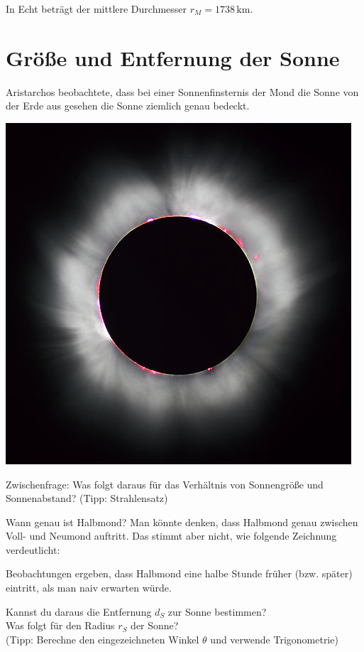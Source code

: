 \documentclass{scrartcl}
\newcommand{\RM}{r_M} %
\newcommand{\RS}{r_S} %
\newcommand{\DS}{d_S} %
\newcommand{\km}{\,\mathrm{km}} %
\begin{document}
  In Echt beträgt der mittlere Durchmesser $\RM = 1738 \km$.

  \newpage
  \section{Größe und Entfernung der Sonne}

  Aristarchos beobachtete, dass bei einer Sonnenfinsternis der Mond die Sonne von der Erde aus gesehen die Sonne ziemlich genau bedeckt.

  \begin{center}
    \includegraphics{solar_eclipse.jpg}
  \end{center}

  \vspace{4cm}

  Zwischenfrage: Was folgt daraus für das Verhältnis von Sonnengröße und Sonnenabstand? (Tipp: Strahlensatz)

  Wann genau ist Halbmond? Man könnte denken, dass Halbmond genau zwischen Voll- und Neumond auftritt. Das stimmt aber nicht, wie folgende Zeichnung verdeutlicht:

  \vspace{4cm}

  Beobachtungen ergeben, dass Halbmond eine halbe Stunde früher (bzw. später) eintritt, als man naiv erwarten würde.

  Kannst du daraus die Entfernung $\DS$ zur Sonne bestimmen?\\
  Was folgt für den Radius $\RS$ der Sonne? \\
  (Tipp: Berechne den eingezeichneten Winkel $\theta$ und verwende Trigonometrie)
\end{document}
